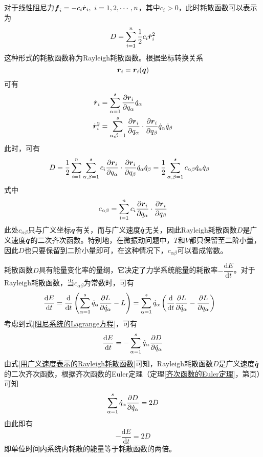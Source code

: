 对于线性阻尼力$\boldsymbol{f}_i = -c_i \dot{\boldsymbol{r}}_i,\,\,i=1,2,\cdots,n$，其中$c_i > 0$，此时耗散函数可以表示为
\begin{equation*}
	D = \sum_{i=1}^n \frac12 c_i \dot{\mbf{r}}_i^2 %
\end{equation*}
这种形式的耗散函数称为{\heiti Rayleigh耗散函数}。根据坐标转换关系
\begin{equation*}
	\boldsymbol{r}_i = \boldsymbol{r}_i(\boldsymbol{q})
\end{equation*}
可有
\begin{align*}
	\dot{\boldsymbol{r}}_i & = \sum_{\alpha=1}^s \frac{\partial \boldsymbol{r}_i}{\partial q_\alpha} \dot{q}_\alpha \\
	\dot{\boldsymbol{r}}_i^2 & = \sum_{\alpha,\beta=1}^s \frac{\partial \boldsymbol{r}_i}{\partial q_\alpha} \cdot \frac{\partial \boldsymbol{r}_i}{\partial q_\beta} \dot{q}_\alpha \dot{q}_\beta
\end{align*}
此时，可有
\begin{align}
	D & = \frac12 \sum_{i=1}^n \sum_{\alpha,\beta=1}^s c_i \frac{\partial \boldsymbol{r}_i}{\partial q_\alpha} \cdot \frac{\partial \boldsymbol{r}_i}{\partial q_\beta} \dot{q}_\alpha \dot{q}_\beta = \frac12 \sum_{\alpha,\beta=1}^s c_{\alpha\beta} \dot{q}_\alpha \dot{q}_\beta
	\label{用广义速度表示的Rayleigh耗散函数}
\end{align}
式中
\begin{equation*}
	c_{\alpha\beta} = \sum_{i=1}^n c_i \frac{\partial \boldsymbol{r}_i}{\partial q_\alpha} \cdot \frac{\partial \boldsymbol{r}_i}{\partial q_\beta}
\end{equation*}
此处$c_{\alpha\beta}$只与广义坐标$\boldsymbol{q}$有关，而与广义速度$\dot{\boldsymbol{q}}$无关，因此Rayleigh耗散函数$D$是广义速度$\dot{\boldsymbol{q}}$的二次齐次函数。特别地，在微振动问题中，$T$和$V$都只保留至二阶小量，因此$D$也只要保留到二阶小量即可，在这种情况下，$c_{\alpha\beta}$可以看成常数。

耗散函数$D$具有能量变化率的量纲，它决定了力学系统能量的耗散率$-\dfrac{\mathrm{d}E}{\mathrm{d}t}$。对于Rayleigh耗散函数，当$c_{\alpha\beta}$为常数时，可有
\begin{align*}
	\frac{\mathrm{d} E}{\mathrm{d} t} & = \frac{\mathrm{d}}{\mathrm{d} t} \left(\sum_{\alpha=1}^s \dot{q}_\alpha \frac{\partial L}{\partial \dot{q}_\alpha} - L\right) = \sum_{\alpha=1}^s \dot{q}_\alpha \left(\frac{\mathrm{d}}{\mathrm{d} t} \frac{\partial L}{\partial \dot{q}_\alpha} - \frac{\partial L}{\partial q_\alpha}\right)
\end{align*}
考虑到式\eqref{阻尼系统的Lagrange方程}，可有
\begin{equation*}
	\frac{\mathrm{d} E}{\mathrm{d} t} = -\sum_{\alpha=1}^s \dot{q}_\alpha \frac{\partial D}{\partial \dot{q}_\alpha}
\end{equation*}
由式\eqref{用广义速度表示的Rayleigh耗散函数}可知，Rayleigh耗散函数$D$是广义速度$\dot{\boldsymbol{q}}$的二次齐次函数，根据齐次函数的Euler定理（定理\ref{齐次函数的Euler定理}，第\pageref{齐次函数的Euler定理}页）可知
\begin{equation*}
	\sum_{\alpha=1}^s \dot{q}_\alpha \frac{\partial D}{\partial \dot{q}_\alpha} = 2D
\end{equation*}
由此即有
\begin{equation}
	-\frac{\mathrm{d} E}{\mathrm{d} t} = 2D
\end{equation}
即单位时间内系统内耗散的能量等于耗散函数的两倍。
